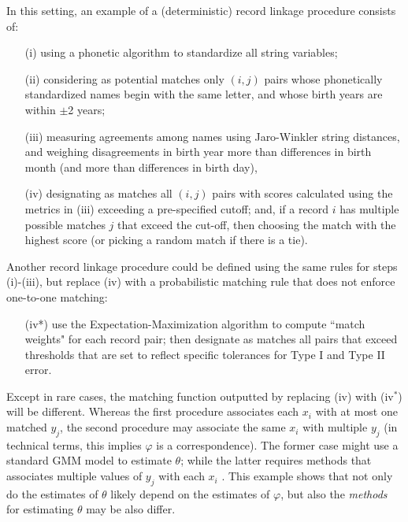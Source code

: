 \documentclass[12pt]{article}
\begin{document}
In this setting, an example of a (deterministic) record linkage procedure consists of: 
\begin{enumerate}
\item[(i)] using a phonetic algorithm to standardize all string variables; 
\item[(ii)] considering as potential matches only $(i,j)$ pairs whose phonetically standardized names begin with the same letter, and whose birth years are within $\pm$2 years;
\item[(iii)] measuring agreements among names using Jaro-Winkler string distances, and weighing disagreements in birth year more than differences in birth month (and more than differences in birth day), 
\item[(iv)] designating as matches all $(i,j)$ pairs with scores calculated using the metrics in (iii) exceeding a pre-specified cutoff; and, if a record $i$ has multiple possible matches $j$ that exceed the cut-off, then choosing the match with the highest score (or picking a random match if there is a tie).  
\end{enumerate}

Another record linkage procedure could be defined using the same rules for steps (i)-(iii), but replace (iv) with a probabilistic matching rule that does not enforce one-to-one matching:
\begin{enumerate}
\item[(iv*)]  use the Expectation-Maximization algorithm to compute ``match weights" for each record pair; then designate as matches all pairs that exceed thresholds that are set to reflect specific tolerances for Type I and Type II error.
\end{enumerate} 

Except in rare cases, the matching function outputted by replacing (iv) with (iv$^*$) will be different.  Whereas the first procedure associates each $x_i$ with at most one matched $y_j$, the second procedure may associate the same $x_i$ with multiple $y_j$ (in technical terms, this implies $\varphi$ is a correspondence).  The former case might use a standard GMM model to estimate $\theta$; while the latter requires methods that associates multiple values of $y_j$ with each $x_i$ \citep{ahl2019}.  This example shows that not only do the estimates of $\theta$ likely depend on the estimates of $\varphi$, but also the \textit{methods} for estimating $\theta$ may be also differ. 
\end{document}

